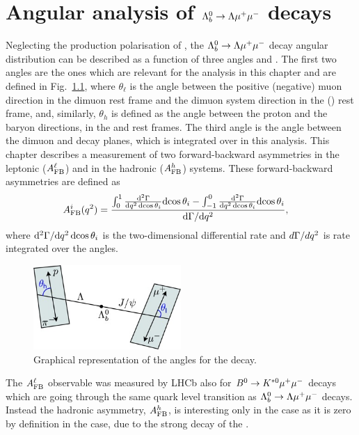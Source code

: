 \chapter{Angular analysis of $\protect\Lambda^0_b\rightarrow\Lambda\mu^+\mu^-$ decays}
\label{sec:ang_ana}

Neglecting the production polarisation of \Lb, the $\Lambda^0_b\rightarrow\Lambda\mu^+\mu^-$ decay angular distribution can be described 
as a function of three angles and \qsq. The first two angles are the ones which are relevant for the
analysis in this chapter and are defined in Fig.~\ref{fig:Lb_angles}, where $\theta_\ell$ is the angle between 
the positive (negative) muon direction in the dimuon rest frame and the dimuon system direction in the \Lb (\Lbbar) 
rest frame, and, similarly, $\theta_h$ is defined as the angle between the proton and the \Lz baryon directions, 
in the \Lz and \Lb rest frames. The third angle is the angle between the dimuon and \Lz decay planes, which is integrated
over in this analysis. %
This chapter describes a measurement of two forward-backward asymmetries in the leptonic
($A_{\rm FB}^\ell$) and in the hadronic ($A_{\rm FB}^h$) systems. These forward-backward asymmetries
are defined as
\begin{align}
A_{\rm FB}^i(q^2)&=\frac{\int_0^1 \frac{\mathrm{d}^2\Gamma}{\mathrm{d}q^2\,\mathrm{d}\!\cos\theta_i} \mathrm{d}\!\cos\theta_i-
               \int^0_{-1} \frac{\mathrm{d}^2\Gamma}{\mathrm{d}q^2\,\mathrm{d}\!\cos\theta_i} \mathrm{d}\!\cos\theta_i}{\mathrm{d}\Gamma / \mathrm{d} q^2},
\label{eq:afbTh}
\end{align}
where $\mathrm{d}^2\Gamma/\mathrm{d} q^2\,\mathrm{d}\!\cos\theta_i$ is the two-dimensional differential rate and
$d\Gamma / dq^2$ is rate integrated over the angles. 

\begin{figure}[h!]
\centering
\includegraphics[width=0.5\textwidth]{Lmumu/figs/angles.jpeg}
\caption{Graphical representation of the angles for the \decay{\Lb}{\Lz\mumu} decay.}
\label{fig:Lb_angles}
\end{figure}

The $A_{\rm FB}^\ell$ observable was measured by LHCb also for $B^0\rightarrow K^{*0}\mu^+\mu^-$ decays
which are going through the same quark level transition as $\Lambda^0_b\rightarrow\Lambda\mu^+\mu^-$ decays. Instead the hadronic
asymmetry, $A_{\rm FB}^h$, is interesting only in the \Lb case as it is zero by definition
in the \Bz case, due to the strong decay of the \Kstarz.

